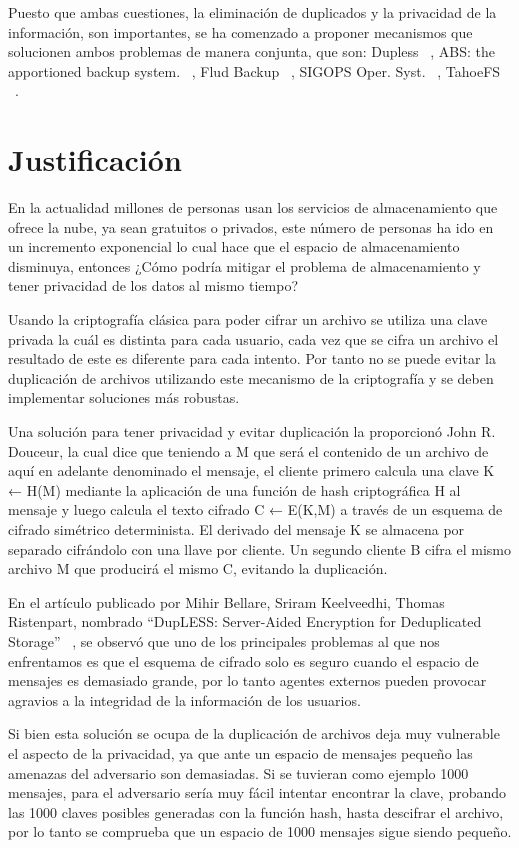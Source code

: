 Puesto que ambas cuestiones, la eliminación de duplicados y la privacidad de la información, son importantes, se ha comenzado a
proponer mecanismos que solucionen ambos problemas de manera conjunta, que son: Dupless ~\cite{Bellare}, ABS: the apportioned backup
system. ~\cite{abs}, Flud Backup ~\cite{flud}, SIGOPS Oper. Syst. ~\cite{sigops}, TahoeFS ~\cite{tahoe}.

\section{Justificación}

En la actualidad millones de personas usan los servicios de almacenamiento que ofrece la nube, ya sean gratuitos o privados, este número de personas ha ido en un incremento exponencial lo cual hace que el espacio de almacenamiento disminuya, entonces ¿Cómo podría mitigar el problema de almacenamiento y tener privacidad de los datos al mismo tiempo?

Usando la criptografía clásica para poder cifrar un archivo se utiliza una clave privada la cuál es distinta para cada usuario, cada vez que se cifra un archivo el resultado de este es diferente para cada intento. Por tanto no se puede evitar la duplicación de archivos utilizando este mecanismo de la criptografía y se deben implementar soluciones más robustas.

Una solución para tener privacidad y evitar duplicación la proporcionó John R. Douceur, la cual dice que teniendo a M que será el contenido de un archivo de aquí en adelante denominado el mensaje, el cliente primero calcula una clave K ← H(M) mediante la aplicación de una función de hash criptográfica H al mensaje y luego calcula el texto cifrado C ← E(K,M) a través de un esquema de cifrado simétrico determinista. El derivado del mensaje K se almacena por separado cifrándolo con una llave por cliente. Un segundo cliente B cifra el mismo archivo M que producirá el mismo C, evitando la duplicación. ~\cite{donceur}

En el artículo publicado por Mihir Bellare, Sriram Keelveedhi, Thomas Ristenpart, nombrado “DupLESS: Server-Aided Encryption for Deduplicated Storage” ~\cite{Bellare}, se observó que uno de los principales problemas al que nos enfrentamos es que el esquema de cifrado solo es seguro cuando el espacio de mensajes es demasiado grande, por lo tanto agentes externos pueden provocar agravios a la integridad de la información de los usuarios.

Si bien esta solución se ocupa de la duplicación de archivos deja muy vulnerable el aspecto de la privacidad, ya que ante un espacio de mensajes pequeño las amenazas del adversario son demasiadas. Si se tuvieran como ejemplo 1000 mensajes, para el adversario sería muy fácil intentar encontrar la clave, probando las 1000 claves posibles generadas con la función hash, hasta descifrar el archivo, por lo tanto se comprueba que un espacio de 1000 mensajes sigue siendo pequeño.

